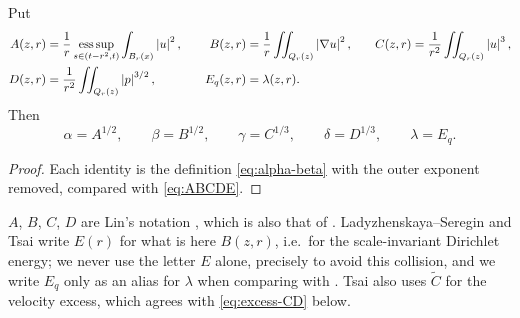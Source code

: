 \documentclass[11pt,reqno]{amsart}
\begin{document}
\begin{lemma}
\label{lem:dictionary}
Put
\begin{equation}\label{eq:ABCDE}
\begin{aligned}
  A(z,r)&=\frac1r\operatorname*{ess\,sup}_{s\in(t-r^{2},t)}\int_{B_{r}(x)}\left\lvert u \right\rvert^{2},
  &\quad
  B(z,r)&=\frac1r\iint_{Q_{r}(z)}\left\lvert \nabla u \right\rvert^{2},
  &\quad
  C(z,r)&=\frac1{r^{2}}\iint_{Q_{r}(z)}\left\lvert u \right\rvert^{3},\\
  D(z,r)&=\frac1{r^{2}}\iint_{Q_{r}(z)}\left\lvert p \right\rvert^{3/2},
  &\quad
  E_{q}(z,r)&=\lambda(z,r).
\end{aligned}
\end{equation}
Then
\begin{equation}\label{eq:dictionary}
  \alpha=A^{1/2},\qquad\beta=B^{1/2},\qquad\gamma=C^{1/3},
  \qquad\delta=D^{1/3},\qquad\lambda=E_{q} .
\end{equation}
\end{lemma}

\begin{proof}
Each identity is the definition \eqref{eq:alpha-beta} with the outer exponent
removed, compared with \eqref{eq:ABCDE}.
\end{proof}

\begin{remark}\label{rem:letters}
$A$, $B$, $C$, $D$ are Lin's notation \cite[\S3]{Lin1998}, which is also that of
\cite{CKN1982}. Ladyzhenskaya--Seregin \cite[\S5]{LadyzhenskayaSeregin1999} and
Tsai \cite[\S6.3]{Tsai2018} write $E(r)$ for what is here $B(z,r)$, i.e.\ for the
scale-invariant Dirichlet energy; we never use the letter $E$ alone, precisely
to avoid this collision, and we write $E_{q}$ only as an alias for $\lambda$ when
comparing with \cite{Tsai2018}. Tsai \cite[\S6.3]{Tsai2018} also uses
$\widetilde C$ for the velocity excess, which agrees with \eqref{eq:excess-CD}
below.
\end{remark}
\end{document}
